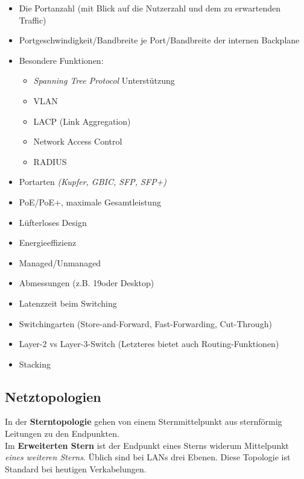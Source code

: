 \documentclass[a4paper, 12pt]{report}
\begin{document}
\begin{multicols}{2}
\begin{itemize}
    \item Die Portanzahl (mit Blick auf die Nutzerzahl und dem zu erwartenden
	Traffic)
    \item Portgeschwindigkeit/Bandbreite je Port/Bandbreite der internen
	Backplane
    \item Besondere Funktionen:
	\begin{itemize}
	    \item \emph{Spanning Tree Protocol} Unterstützung
	    \item VLAN
	    \item LACP (Link Aggregation)
	    \item Network Access Control
	    \item RADIUS
	\end{itemize}
    \item Portarten \emph{(Kupfer, GBIC, SFP, SFP+)}
    \item PoE/PoE+, maximale Gesamtleistung
    \item Lüfterloses Design
    \item Energieeffizienz
    \item Managed/Unmanaged
    \item Abmessungen (z.B. 19\dq oder Desktop)
    \item Latenzzeit beim Switching
    \item Switchingarten (Store-and-Forward, Fast-Forwarding, Cut-Through)
    \item Layer-2 vs Layer-3-Switch (Letzteres bietet auch Routing-Funktionen)
    \item Stacking
\end{itemize}


\subsection{Netztopologien}

In der \textbf{Sterntopologie} gehen von einem Sternmittelpunkt aus sternförmig
Leitungen zu den Endpunkten. \\

Im \textbf{Erweiterten Stern} ist der Endpunkt eines Sterns widerum Mittelpunkt
\emph{eines weiteren Sterns}. Üblich sind bei LANs drei Ebenen. Diese Topologie
ist Standard bei heutigen Verkabelungen. \\


\end{multicols}
\end{document}
